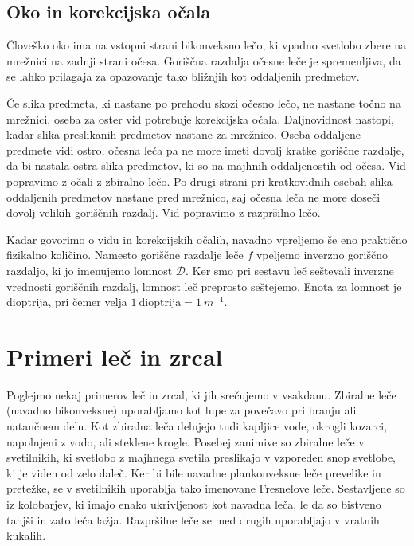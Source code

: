 \subsection*{Oko in korekcijska očala}
Človeško oko ima na vstopni strani bikonveksno lečo, ki vpadno 
svetlobo zbere na mrežnici na zadnji strani očesa. 
Goriščna razdalja očesne leče je spremenljiva, da se lahko 
prilagaja za opazovanje tako bližnjih kot oddaljenih
predmetov. 

Če slika predmeta, ki nastane po prehodu skozi očesno lečo,
ne nastane točno na mrežnici, oseba za oster vid potrebuje korekcijska očala.
Daljnovidnost nastopi, kadar slika preslikanih predmetov nastane
za mrežnico. Oseba oddaljene predmete vidi ostro, očesna leča 
pa ne more imeti dovolj kratke goriščne razdalje, da bi nastala ostra 
slika predmetov, ki so na majhnih oddaljenostih od očesa. Vid popravimo z očali z 
zbiralno lečo. Po drugi strani pri kratkovidnih osebah slika
oddaljenih predmetov nastane pred mrežnico, saj očesna leča 
ne more doseči dovolj velikih goriščnih razdalj. Vid popravimo
z razpršilno lečo. 

\begin{remark}
 Kadar govorimo o vidu in korekcijskih očalih, navadno vpreljemo
 še eno praktično fizikalno količino. Namesto goriščne razdalje
 leče $f$ vpeljemo inverzno goriščno razdaljo, ki jo imenujemo 
 lomnost $\mathcal{D}$. Ker smo pri sestavu leč seštevali inverzne
 vrednosti goriščnih razdalj, lomnost leč preprosto seštejemo. 
 Enota za lomnost je dioptrija, pri čemer velja $1~\mathrm{dioptrija} = 
 1~\si{m}^{-1}$.
\end{remark}

\section{Primeri leč in zrcal}
Poglejmo nekaj primerov leč in zrcal, ki jih srečujemo v vsakdanu. Zbiralne leče
(navadno bikonveksne) uporabljamo kot lupe za povečavo pri branju ali 
natančnem delu. Kot zbiralna leča delujejo tudi kapljice vode, okrogli 
kozarci, napolnjeni z vodo, ali steklene krogle. Posebej zanimive so zbiralne leče
v svetilnikih, ki svetlobo z majhnega svetila preslikajo v vzporeden snop svetlobe, ki 
je viden od zelo daleč. Ker bi bile navadne plankonveksne leče prevelike in pretežke, se
v svetilnikih uporablja tako imenovane Fresnelove leče. Sestavljene
so iz kolobarjev, ki imajo enako ukrivljenost kot navadna leča, le da so bistveno
tanjši in zato leča lažja. Razpršilne leče se med drugih uporabljajo v vratnih kukalih. 

